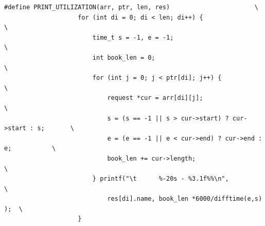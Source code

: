 \documentclass{article}
\begin{document}
\begin{Verbatim}[gobble=8]
                #define PRINT_UTILIZATION(arr, ptr, len, res)                       \
                    for (int di = 0; di < len; di++) {                              \
                        time_t s = -1, e = -1;                                      \
                        int book_len = 0;                                           \
                        for (int j = 0; j < ptr[di]; j++) {                         \
                            request *cur = arr[di][j];                              \
                            s = (s == -1 || s > cur->start) ? cur->start : s;       \
                            e = (e == -1 || e < cur->end) ? cur->end : e;           \
                            book_len += cur->length;                                \
                        } printf("\t      %-20s - %3.1f%%\n",                       \
                            res[di].name, book_len *6000/difftime(e,s) );  \
                    }
                

\end{Verbatim}
\end{document}
